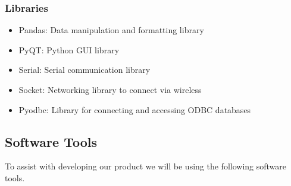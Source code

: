 \documentclass[12pt]{article}
\begin{document}
\subsubsection{Libraries}
\begin{itemize}
	\item Pandas: Data manipulation and formatting library
	\item PyQT: Python GUI library
	\item Serial: Serial communication library
	\item Socket: Networking library to connect via wireless
	\item Pyodbc: Library for connecting and accessing ODBC databases
\end{itemize}

\newpage
\subsection{Software Tools}
To assist with developing our product we will be using the following software tools.
\end{document}
